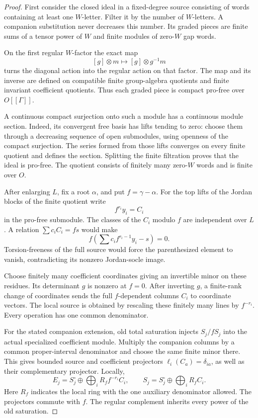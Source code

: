 \documentclass[11pt]{article}
\theoremstyle{definition}\newtheorem{definition}[theorem]{Definition}
\begin{document}
\begin{proof}
First consider the closed ideal in a fixed-degree source consisting
of words containing at least one \(W\)-letter.  Filter it by the
number of \(W\)-letters.  A companion substitution never decreases
this number.  Its graded pieces are finite sums of a tensor power
of \(W\) and finite modules of zero-\(W\) gap words.

On the first regular \(W\)-factor the exact map
\[
       [g]\otimes m\longmapsto[g]\otimes g^{-1}m
\]
turns the diagonal action into the regular action on that factor.
The map and its inverse are defined on compatible finite
group-algebra quotients and finite invariant coefficient quotients.
Thus each graded piece is compact pro-free over \(O[[\Gamma]]\).

A continuous compact surjection onto such a module has a
continuous module section.  Indeed, its convergent free basis
has lifts tending to zero: choose them through a decreasing
sequence of open submodules, using openness of the compact
surjection.  The series formed from those lifts converges on
every finite quotient and defines the section.  Splitting the
finite filtration proves that the ideal is pro-free.  The
quotient consists of finitely many zero-\(W\) words and is finite
over \(O\).

After enlarging \(L\), fix a root \(\alpha\), and put
\(f=\gamma-\alpha\).  For the top lifts of the Jordan blocks of
the finite quotient write
\[
                    f^{r_i}y_i=C_i
\]
in the pro-free submodule.  The classes of the \(C_i\) modulo
\(f\) are independent over \(L\).  A relation
\(\sum c_iC_i=fs\) would make
\[
 f\left(\sum c_i f^{r_i-1}y_i-s\right)=0.
\]
Torsion-freeness of the full source would force the parenthesized
element to vanish, contradicting its nonzero Jordan-socle image.

Choose finitely many coefficient coordinates giving an invertible
minor on these residues.  Its determinant \(g\) is nonzero at
\(f=0\).  After inverting \(g\), a finite-rank change of coordinates
sends the full \(f\)-dependent columns \(C_i\) to coordinate
vectors.  The local source is obtained by rescaling these finitely
many lines by \(f^{-r_i}\).  Every operation has one common
denominator.

For the stated companion extension, old total saturation injects
\(S_j/fS_j\) into the actual specialized coefficient module.
Multiply the companion columns by a common proper-interval
denominator and choose the same finite minor there.  This gives
bounded source and coefficient projectors
\(\ell_i(C_a)=\delta_{ia}\), as well as their complementary
projector.  Locally,
\begin{equation}\label{eq:wcs-polar-coordinates}
 E_j=S_j^\circ\oplus\bigoplus_i R_f f^{-r_i}C_i,\qquad
 S_j=S_j^\circ\oplus\bigoplus_i R_f C_i .
\end{equation}
Here \(R_f\) indicates the local ring with the one auxiliary
denominator allowed.  The projectors commute with \(f\).  The
regular complement inherits every power of the old saturation.
\end{proof}
\end{document}

